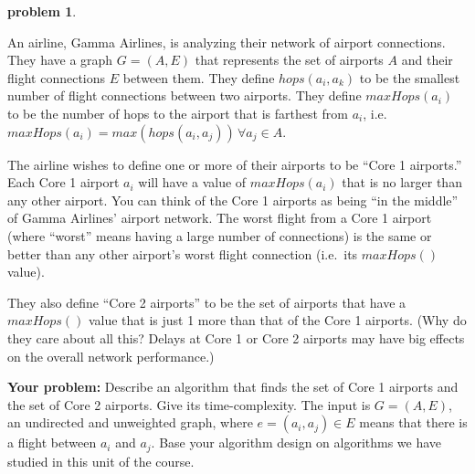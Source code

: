 \documentclass[10pt]{article}
\newtheorem{problem}{\sc\color{cit}problem}
\begin{document}
\pagebreak

\begin{problem}\end{problem}

An airline, Gamma Airlines, is analyzing their network of airport connections.  They have a graph $G=(A,E)$ that represents the set of airports $A$ and their flight connections $E$ between them. They define $hops(a_i, a_k)$ to be the smallest number of flight connections between two airports.  They define $maxHops(a_i)$ to be the number of hops to the airport that is farthest from $a_i$, i.e. $maxHops(a_i) = max( hops(a_i, a_j) )\, \forall a_j \in A$.

The airline wishes to define one or more of their airports to be ``Core 1 airports.'' Each Core 1 airport $a_i$ will have a value of $maxHops(a_i)$ that is no larger than any other airport.  You can think of the Core 1 airports as being ``in the middle'' of Gamma Airlines' airport network.  The worst flight from a Core 1 airport (where ``worst'' means having a large number of connections) is the same or better than any other airport's worst flight connection (i.e.\ its $maxHops()$ value).

They also define ``Core 2 airports'' to be the set of airports that have a $maxHops()$ value that is just 1 more than that of the Core 1 airports.  (Why do they care about all this?  Delays at Core 1 or Core 2 airports may have big effects on the overall network performance.)

\textbf{Your problem: } Describe an algorithm that finds the set of Core 1 airports and the set of Core 2 airports.  Give its time-complexity.   The input is $G=(A,E)$, an undirected and unweighted graph, where $e = (a_i, a_j) \in E$ means that there is a flight between $a_i$ and $a_j$. Base your algorithm design on algorithms we have studied in this unit of the course.
\end{document}
